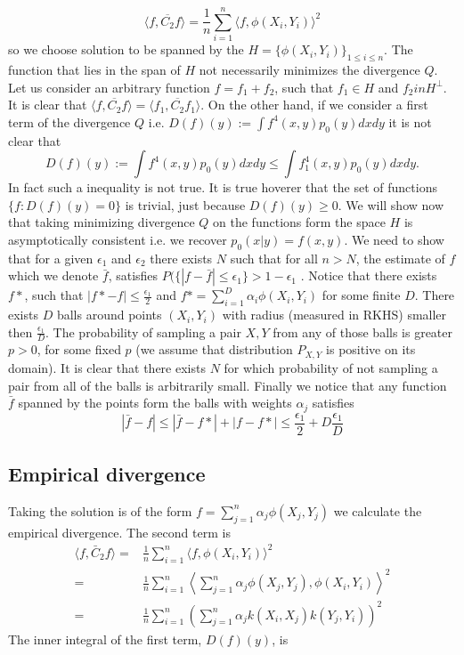 \documentclass[10pt]{article}
\begin{document}
\begin{equation}
 \langle f, \overline{ C_2} f \rangle = \frac 1 n \sum_{i=1}^n \langle f , \phi(X_i,Y_i) \rangle^2   
\end{equation}
so we choose solution to be spanned by the $H = \{ \phi(X_i,Y_i) \}_{1 \leq i \leq n}$. The function that lies in the span of $H$ not necessarily minimizes the divergence $Q$. Let us consider an arbitrary function $f = f_1 + f_2$, such that $f_1 \in H$ and $f_2 in H^\perp$. It is clear that  $\langle f, \overline{ C_2} f \rangle = \langle f_1, \overline{ C_2} f_1 \rangle$. On the other hand, if we consider a first term of the divergence $Q$ i.e. $D(f)(y) := \int f^4(x,y) p_0(y) dx dy$ it is not clear that 
\begin{equation}
 D(f)(y) := \int f^4(x,y) p_0(y) dx dy \leq \int f_1^4(x,y) p_0(y) dx dy.
\end{equation}
In fact such a inequality is not true. It is true  hoverer that the set of functions $\{ f: D(f)(y) =0\}$ is trivial, just because $D(f)(y) \geq 0$. We will show now that taking minimizing divergence $Q$ on the functions form the space $H$ is asymptotically consistent i.e. we recover $p_0(x|y) = f(x,y)$. We need to show that for a given $\epsilon_1$ and $\epsilon_2$ there exists $N$ such that for all $n>N$, the estimate of $f$ which we denote  $\bar f$, satisfies $P( \{ |f-\bar f| \leq \epsilon_1 \} > 1 -\epsilon_1 $ . Notice that there exists $f*$, such that $|f* - f| \leq \frac {\epsilon_1}{ 2}$ and $f* = \sum_{i=1}^D \alpha_i \phi(X_i,Y_i)$ for some finite $D$. There exists $D$ balls around points $(X_i,Y_i)$ with radius (measured in RKHS) smaller then $\frac {\epsilon_1}{ D}$. The probability of sampling a pair $X,Y$ from any of those balls is greater $p>0$, for some fixed $p$ (we assume that distribution $P_{X,Y}$ is positive on its domain). It is clear that there exists $N$ for which probability of not sampling a pair from all of the balls is arbitrarily small. Finally we notice that any function $\bar f$ spanned by the points form the balls with weights $\alpha_j$  satisfies 
$$
|\bar f - f| \leq  |\bar f - f*| + |f - f*| \leq  \frac {\epsilon_1}{ 2} + D \frac {\epsilon_1}{ D}
$$

\subsection{Empirical divergence}
Taking the solution is of the form  $f = \sum_{j=1}^{n} \alpha_j \phi(X_j,Y_j)$  we calculate the empirical divergence. The second term is
\begin{align}
  \langle f, \bar C_2 f \rangle =& \frac 1 n \sum_{i=1}^n \langle f , \phi(X_i,Y_i) \rangle^2 \\
  =& \frac 1 n \sum_{i=1}^n \left \langle \sum_{j=1}^{n} \alpha_j \phi(X_j,Y_j) , \phi(X_i,Y_i) \right \rangle^2 \\
   =& \frac 1 n \sum_{i=1}^n \left( \sum_{j=1}^{n} \alpha_j k(X_i,X_j) k(Y_j,Y_i) \right)^2
\end{align}
The inner integral of the first term, $D(f)(y)$, is 
\end{document}
